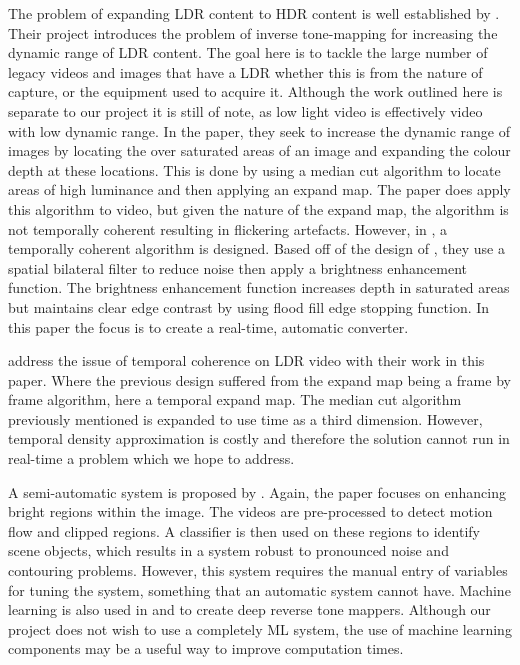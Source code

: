 \documentclass[12pt,a4paper]{article}
\begin{document}
	The problem of expanding LDR content to HDR content is well established by \cite{Banterle:2006:ITM:1174429.1174489}. Their project introduces the problem of inverse tone-mapping for increasing the dynamic range of LDR content. The goal here is to tackle the large number of legacy videos and images that have a LDR whether this is from the nature of capture, or the equipment used to acquire it. Although the work outlined here is separate to our project it is still of note, as low light video is effectively video with low dynamic range. In the paper, they seek to increase the dynamic range of images by locating the over saturated areas of an image and expanding the colour depth at these locations.  This is done by using a median cut algorithm to locate areas of high luminance and then applying an expand map. The paper does apply this algorithm to video, but given the nature of the expand map, the algorithm is not temporally coherent resulting in flickering artefacts. However, in \cite{Rempel:2007:LOR:1276377.1276426}, a temporally coherent algorithm is designed. Based off of the design of \cite{Banterle:2006:ITM:1174429.1174489}, they use a spatial bilateral filter to reduce noise then apply a brightness enhancement function. The brightness enhancement function increases depth in saturated areas but maintains clear edge contrast by using flood fill edge stopping function. In this paper the focus is to create a real-time, automatic converter.

	\cite{Banterle:2008:ELD:1921264.1921275} address the issue of temporal coherence on LDR video with their work in this paper. Where the previous design suffered from the expand map being a frame by frame algorithm, here a temporal expand map. The median cut algorithm previously mentioned is expanded to use time as a third dimension. However, temporal density approximation is costly and therefore the solution cannot run in real-time a problem which we hope to address.

	A semi-automatic system is proposed by \cite{doi:10.1111/j.1467-8659.2008.01265.x}. Again, the paper focuses on enhancing bright regions within the image. The videos are pre-processed to detect motion flow and clipped regions. A classifier is then used on these regions to identify scene objects, which results in a system robust to pronounced noise and contouring problems. However, this system requires the manual entry of variables for tuning the system, something that an automatic system cannot have. Machine learning is also used in \cite{endo2017deep} and \cite{Eilertsen:2017:HIR:3130800.3130816} to create deep reverse tone mappers. Although our project does not wish to use a completely ML system, the use of machine learning components may be a useful way to improve computation times. 
\end{document}
